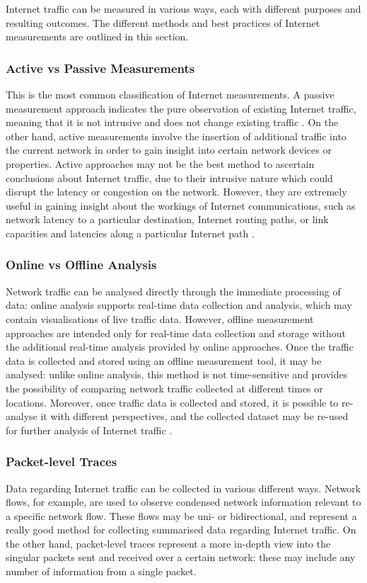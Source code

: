 \documentclass{l4proj}
\begin{document}
Internet traffic can be measured in various ways, each with different purposes and resulting outcomes. The different methods and best practices of Internet measurements are outlined in this section.

\subsubsection{Active vs Passive Measurements} This is the most common classification of Internet measurements. A passive measurement approach indicates the pure observation of existing Internet traffic, meaning that it is not intrusive and does not change existing traffic \citep{John2010}. On the other hand, active measurements involve the insertion of additional traffic into the current network in order to gain insight into certain network devices or properties. Active approaches may not be the best method to ascertain conclusions about Internet traffic, due to their intrusive nature which could disrupt the latency or congestion on the network. However, they are extremely useful in gaining insight about the workings of Internet communications, such as network latency to a particular destination, Internet routing paths, or link capacities and latencies along a particular Internet path \citep{William2001, Medi2005}.

\subsubsection{Online vs Offline Analysis} Network traffic can be analysed directly through the immediate processing of data: online analysis supports real-time data collection and analysis, which may contain visualisations of live traffic data. However, offline measurement approaches are intended only for real-time data collection and storage without the additional real-time analysis provided by online approaches. Once the traffic data is collected and stored using an offline measurement tool, it may be analysed: unlike online analysis, this method is not time-sensitive and provides the possibility of comparing network traffic collected at different times or locations. Moreover, once traffic data is collected and stored, it is possible to re-analyse it with different perspectives, and the collected dataset may be re-used for further analysis of Internet traffic \citep{John2010}.

\subsubsection{Packet-level Traces} Data regarding Internet traffic can be collected in various different ways. Network flows, for example, are used to observe condensed network information relevant to a specific network flow. These flows may be uni- or bidirectional, and represent a really good method for collecting summarised data regarding Internet traffic. On the other hand, packet-level traces represent a more in-depth view into the singular packets sent and received over a certain network: these may include any number of information from a single packet.
\end{document}
